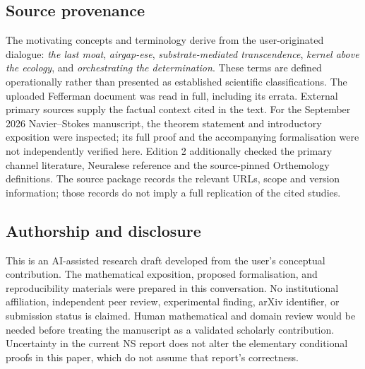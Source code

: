 \documentclass[11pt,a4paper]{article}
\theoremstyle{definition}
\theoremstyle{remark}
\begin{document}
\subsection*{Source provenance}
The motivating concepts and terminology derive from the user-originated dialogue: \emph{the last moat}, \emph{airgap-ese}, \emph{substrate-mediated transcendence}, \emph{kernel above the ecology}, and \emph{orchestrating the determination}. These terms are defined operationally rather than presented as established scientific classifications. The uploaded Fefferman document was read in full, including its errata. External primary sources supply the factual context cited in the text. For the September 2026 Navier--Stokes manuscript, the theorem statement and introductory exposition were inspected; its full proof and the accompanying formalisation were not independently verified here. Edition 2 additionally checked the primary channel literature, Neuralese reference and the source-pinned Orthemology definitions. The source package records the relevant URLs, scope and version information; those records do not imply a full replication of the cited studies.

\subsection*{Authorship and disclosure}
This is an AI-assisted research draft developed from the user's conceptual contribution. The mathematical exposition, proposed formalisation, and reproducibility materials were prepared in this conversation. No institutional affiliation, independent peer review, experimental finding, arXiv identifier, or submission status is claimed. Human mathematical and domain review would be needed before treating the manuscript as a validated scholarly contribution. Uncertainty in the current NS report does not alter the elementary conditional proofs in this paper, which do not assume that report's correctness.
\end{document}
